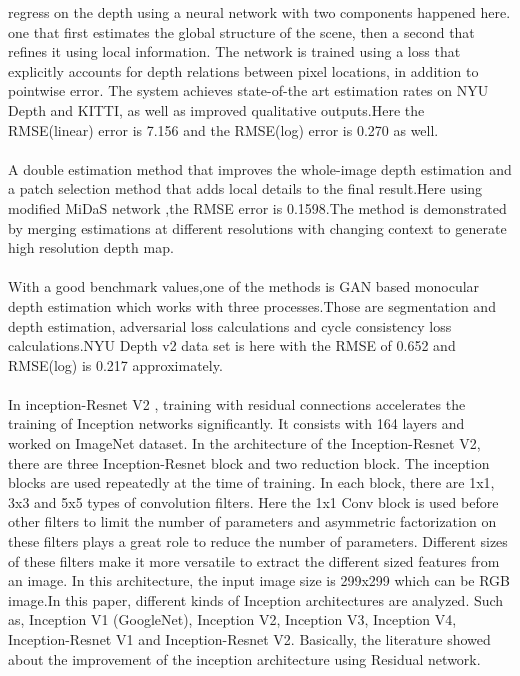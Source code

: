 \documentclass[a4paper,12pt,oneside]{book}
\begin{document}
regress on the depth using a neural network with two components happened here. one that first estimates the global
structure of the scene, then a second that refines it using local information. The network is trained
using a loss that explicitly accounts for depth relations between pixel locations, in addition to pointwise error. The system achieves state-of-the art estimation rates on NYU Depth and KITTI, as well
as improved qualitative outputs.Here the RMSE(linear) error is 7.156 and the RMSE(log) error is 0.270 as well.
\\\\
A double estimation method \cite{c5} that improves the whole-image depth estimation and a patch selection method that adds local details to the final result.Here using modified MiDaS network ,the RMSE error is 
0.1598.The method is demonstrated by merging estimations at different resolutions with changing context to generate high resolution depth map.
\\\\
With a good benchmark values,one of the methods is GAN based monocular depth estimation \cite{c6} which works with three processes.Those are segmentation and depth estimation, adversarial loss calculations
and cycle consistency loss calculations.NYU Depth v2 data set is here with the RMSE of 0.652 and RMSE(log) is 0.217 approximately.
\\\\
In inception-Resnet V2 \cite{szegedy2016inceptionv4}, training with residual
connections accelerates the training of Inception networks significantly. It consists with 164 layers and worked on ImageNet dataset. In the architecture of the Inception-Resnet V2, there are three Inception-Resnet block and two reduction block. The inception blocks are used repeatedly at the time of training. In each block, there are 1x1, 3x3 and 5x5 types of convolution filters. Here the 1x1 Conv block is used before other filters to limit the number of parameters and asymmetric factorization on these filters plays a great role to reduce the number of parameters. Different sizes of these filters make it more versatile to extract the different sized features from an image. In this architecture, the input image size is 299x299 which can be RGB image.In this paper, different kinds of Inception architectures are analyzed. Such as, Inception V1 (GoogleNet), Inception V2, Inception V3, Inception V4, Inception-Resnet V1 and Inception-Resnet V2. Basically, the literature showed about the improvement of the inception architecture using Residual network.\\\\
\end{document}
